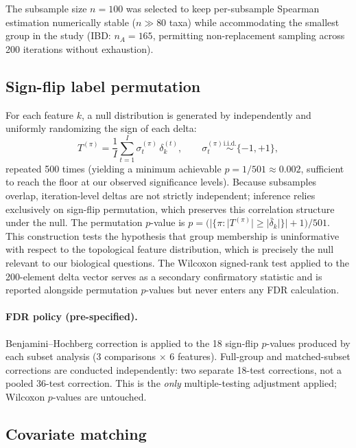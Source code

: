 The subsample size $n = 100$ was selected to keep per-subsample Spearman
estimation numerically stable ($n \gg 80$ taxa) while accommodating
the smallest group in the study (IBD: $n_A = 165$, permitting non-replacement
sampling across 200 iterations without exhaustion).

\subsection{Sign-flip label permutation}
\label{subsec:stats}

For each feature $k$, a null distribution is generated by independently and
uniformly randomizing the sign of each delta:
\begin{equation}
  T^{(\pi)} = \frac{1}{I}\sum_{t=1}^{I} \sigma_t^{(\pi)}\, \delta_k^{(t)},
  \qquad \sigma_t^{(\pi)} \overset{\text{i.i.d.}}{\sim} \{-1, +1\},
  \label{eq:signflip}
\end{equation}
repeated 500 times (yielding a minimum achievable $p = 1/501 \approx 0.002$,
sufficient to reach the floor at our observed significance levels).
Because subsamples overlap, iteration-level deltas are not strictly
independent; inference relies exclusively on sign-flip permutation, which
preserves this correlation structure under the null.
The permutation $p$-value is
$p = \bigl(|\{\pi : |T^{(\pi)}| \geq |\bar{\delta}_k|\}| + 1\bigr) / 501$.
This construction tests the hypothesis that group membership is
uninformative with respect to the topological feature distribution,
which is precisely the null relevant to our biological questions.
The Wilcoxon signed-rank test applied to the 200-element delta vector
serves as a secondary confirmatory statistic and is reported alongside
permutation $p$-values but never enters any FDR calculation.

\paragraph{FDR policy (pre-specified).}
Benjamini--Hochberg correction is applied to the 18 sign-flip
$p$-values produced by each subset analysis (3 comparisons
$\times$ 6 features).
Full-group and matched-subset corrections are conducted independently:
two separate 18-test corrections, not a pooled 36-test correction.
This is the \emph{only} multiple-testing adjustment applied; Wilcoxon
$p$-values are untouched.

\subsection{Covariate matching}
\label{subsec:matching}

